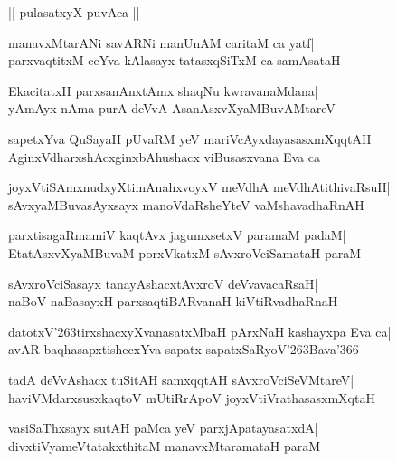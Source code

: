 \documentclass[twoside,12pt,openright]{book}
\def\S{\char'263}
\newcounter{shloka}[chapter]
\begin{document}
\begin{center}
|| pulasatxyX puvAca ||
\end{center}
\begin{shloka}%
manavxMtarANi savARNi manUnAM caritaM ca yatf|\\
parxvaqtitxM ceYva kAlasayx tatasxqSiTxM ca samAsataH
\end{shloka}

\begin{shloka}%
EkacitatxH parxsanAnxtAmx shaqNu kwravanaMdana|\\
yAmAyx nAma purA deVvA AsanAsxvXyaMBuvAMtareV
\end{shloka}

\begin{shloka}%
sapetxYva QuSayaH pUvaRM yeV mariVcAyxdayasasxmXqqtAH|\\
AginxVdharxshAcxginxbAhushacx viBusasxvana Eva ca 
\end{shloka}

\begin{shloka}%
joyxVtiSAmxnudxyXtimAnahxvoyxV meVdhA meVdhAtithivaRsuH|\\
sAvxyaMBuvasAyxsayx manoVdaRsheYteV vaMshavadhaRnAH
\end{shloka}

\begin{shloka}%
parxtisagaRmamiV kaqtAvx jagumxsetxV paramaM padaM|\\
EtatAsxvXyaMBuvaM porxVkatxM sAvxroVciSamataH paraM
\end{shloka}

\begin{shloka}%
sAvxroVciSasayx tanayAshacxtAvxroV deVvavacaRsaH|\\
naBoV naBasayxH parxsaqtiBARvanaH kiVtiRvadhaRnaH
\end{shloka}

\begin{shloka}%
datotxV\S tirxshacxyXvanasatxMbaH pArxNaH kashayxpa Eva ca|\\
avAR baqhasapxtishecxYva sapatx sapatxSaRyoV\S Bava\char'366
\end{shloka}

\begin{shloka}%
tadA deVvAshacx tuSitAH samxqqtAH sAvxroVciSeVMtareV|\\
haviVMdarxsusxkaqtoV mUtiRrApoV joyxVtiVrathasasxmXqtaH
\end{shloka}

\begin{shloka}%
vasiSaThxsayx sutAH paMca yeV parxjApatayasatxdA|\\
divxtiVyameVtatakxthitaM manavxMtaramataH paraM
\end{shloka}
\end{document}
